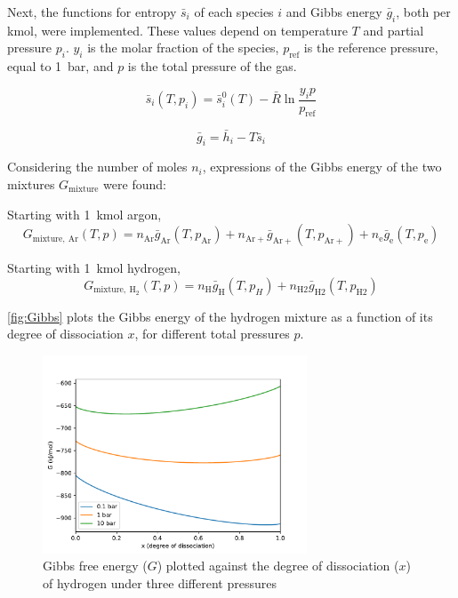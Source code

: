         Next, the functions for entropy $\bar s_i$ of each species $i$ and Gibbs energy $\bar g_i$, both per \unit{kmol}, were implemented. These values depend on temperature $T$ and partial pressure $p_i$. $y_i$ is the molar fraction of the species, $p_\mathrm{ref}$ is the reference pressure, equal to \qty{1}{bar}, and $p$ is the total pressure of the gas.
        
        \begin{equation}
            \bar s_i (T, p_i) = \bar s_i^0 (T) - \bar R \ln \frac{y_i p}{p_\mathrm{ref}}
        \end{equation}

        \begin{equation}
            \bar g_i = \bar h_i - T \bar s_i
        \end{equation}

        Considering the number of moles $n_i$, expressions of the Gibbs energy of the two mixtures $G_\mathrm{mixture}$ were found:

        Starting with \qty{1}{kmol} argon,
        \begin{equation}
            G_\mathrm{mixture,\: Ar}(T, p) = n_\mathrm{Ar} \bar g_\mathrm{Ar}(T, p_\mathrm{Ar}) + n_\mathrm{Ar+} \bar g_\mathrm{Ar+}(T, p_\mathrm{Ar+}) + n_\mathrm{e} \bar g_\mathrm{e}(T, p_\mathrm{e})
        \end{equation}

        Starting with \qty{1}{kmol} hydrogen,
        \begin{equation}
            G_\mathrm{mixture,\: H_2}(T, p) = n_\mathrm{H} \bar g_\mathrm{H}(T, p_H) + n_\mathrm{H2} \bar g_\mathrm{H2}(T, p_\mathrm{H2})
        \end{equation}

        \autoref{fig:Gibbs} plots the Gibbs energy of the hydrogen mixture as a function of its degree of dissociation $x$, for different total pressures $p$.

        \begin{figure}[!ht]
            \centering
            \includegraphics[width=0.7\textwidth]{assets/2 models/Gibbs.pdf}
            \caption{Gibbs free energy ($G$) plotted against the degree of dissociation ($x$) of hydrogen under three different pressures}
            \label{fig:Gibbs}
        \end{figure}

